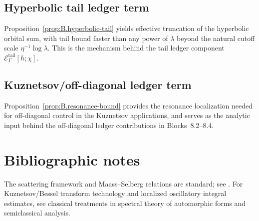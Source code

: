 \subsection{Hyperbolic tail ledger term}
\label{subsec:B.ledger-tail}

Proposition~\ref{prop:B.hyperbolic-tail} yields effective truncation of the hyperbolic orbital sum, with tail bound
faster than any power of $\lambda$ beyond the natural cutoff scale $\eta^{-1}\log\lambda$.  This is the mechanism
behind the tail ledger component $\mathcal{E}^{\mathrm{tail}}_\Gamma[h;\chi]$.

\subsection{Kuznetsov/off-diagonal ledger term}
\label{subsec:B.ledger-kuz}

Proposition~\ref{prop:B.resonance-bound} provides the resonance localization needed for off-diagonal control in the
Kuznetsov applications, and serves as the analytic input behind the off-diagonal ledger contributions in
Blocks~8.2--8.4.

\section*{Bibliographic notes}

The scattering framework and Maass--Selberg relations are standard; see \cite{Hejhal1983,Iwaniec2002,Buser1992}.
For Kuznetsov/Bessel transform technology and localized oscillatory integral estimates, see classical treatments in
spectral theory of automorphic forms and semiclassical analysis.

